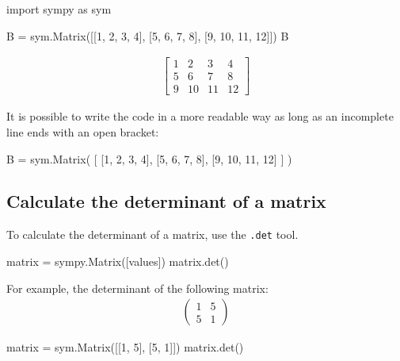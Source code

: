 \begin{pyin}
import sympy as sym

B = sym.Matrix([[1, 2, 3, 4], [5, 6, 7, 8], [9, 10, 11, 12]])
B
\end{pyin}




\begin{equation*}
\begin{split}\displaystyle \left[\begin{matrix}1 & 2 & 3 & 4\\5 & 6 & 7 & 8\\9 & 10 & 11 & 12\end{matrix}\right]\end{split}
\end{equation*}

\begin{note}
It is possible to write the code in a more readable way as long as an incomplete
line ends with an open bracket:
\end{note}


\begin{pyin}
B = sym.Matrix(
    [
        [1, 2, 3, 4],
        [5, 6, 7, 8],
        [9, 10, 11, 12]
    ]
)
\end{pyin}


\subsection{Calculate the determinant of a matrix}
\label{\detokenize{tools-for-mathematics/04-matrices/how/main:calculate-the-determinant-of-a-matrix}}

To calculate the determinant of a matrix, use the \texttt{.det} tool.

\begin{api}
matrix = sympy.Matrix([values])
matrix.det()
\end{api}



For example, the determinant of the following matrix:
\begin{equation*}
\begin{split}
    \begin{pmatrix}
    1 & 5\\
    5 & 1
    \end{pmatrix}
\end{split}
\end{equation*}



\begin{pyin}
matrix = sym.Matrix([[1, 5], [5, 1]])
matrix.det()
\end{pyin}




